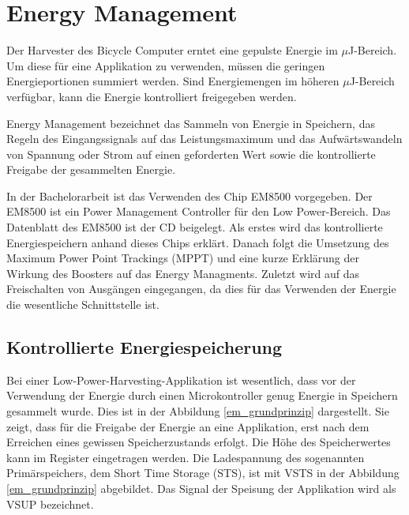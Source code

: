 \section{Energy Management}\label{t_energy_management} 

Der Harvester des Bicycle Computer erntet eine gepulste Energie im $\mu$J-Bereich. Um diese für eine Applikation zu verwenden, müssen die geringen Energieportionen summiert werden. Sind Energiemengen im höheren $\mu$J-Bereich verfügbar, kann die Energie kontrolliert freigegeben werden. 

Energy Management bezeichnet das Sammeln von Energie in Speichern, das Regeln des Eingangssignals auf das Leistungsmaximum und das Aufwärtswandeln von Spannung oder Strom auf einen geforderten Wert sowie die kontrollierte Freigabe der gesammelten Energie.

In der Bachelorarbeit ist das Verwenden des Chip EM8500 vorgegeben. Der EM8500 ist ein Power Management Controller für den Low Power-Bereich. Das Datenblatt des EM8500 ist der CD beigelegt.  Als erstes wird das kontrollierte Energiespeichern anhand dieses Chips erklärt. Danach folgt die Umsetzung des Maximum Power Point Trackings (MPPT) und eine kurze Erklärung der Wirkung des Boosters auf das Energy Managments. Zuletzt wird auf das Freischalten von Ausgängen eingegangen, da dies für das Verwenden der Energie die wesentliche Schnittstelle ist. 

\subsection{Kontrollierte Energiespeicherung}
\label{speicher_konzept}

Bei einer Low-Power-Harvesting-Applikation ist wesentlich, dass vor der Verwendung der Energie durch einen Microkontroller genug Energie in Speichern gesammelt wurde. Dies ist in der Abbildung \ref{em_grundprinzip} dargestellt. Sie zeigt, dass für die Freigabe der Energie an eine Applikation, erst nach dem Erreichen eines gewissen Speicherzustands erfolgt. Die Höhe des Speicherwertes kann im Register eingetragen werden. Die Ladespannung des sogenannten Primärspeichers, dem Short Time Storage (STS), ist mit VSTS in der Abbildung \ref{em_grundprinzip} abgebildet. Das Signal der Speisung der Applikation wird als VSUP bezeichnet.


